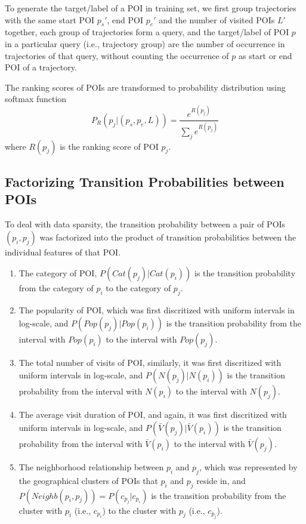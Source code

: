 To generate the target/label of a POI in training set,
we first group trajectories with the same start POI $p_s'$, end POI $p_e'$ and the number of visited POIs $L'$ together,
each group of trajectories form a query,
and the target/label of POI $p$ in a particular query (i.e., trajectory group) are the number of occurrence
in trajectories of that query, 
without counting the occurrence of $p$ as start or end POI of a trajectory.

The ranking scores of POIs are transformed to probability distribution using softmax function
\begin{displaymath}
    P_R(p_j |(p_s, p_e, L)) = \frac{e^{R(p_j)}}{\sum_j e^{R(p_j)}}
\end{displaymath}
where $R(p_j)$ is the ranking score of POI $p_j$.


\subsection{Factorizing Transition Probabilities between POIs}
\label{method:transition}
To deal with data sparsity,
the transition probability between a pair of POIs $(p_i, p_j)$ was factorized into the product of
transition probabilities between the individual features of that POI.
\begin{enumerate}
\item The category of POI, $P(Cat(p_j) | Cat(p_i))$
      is the transition probability from the category of $p_i$ to the category of $p_j$.
\item The popularity of POI, which was first discritized with uniform intervals in log-scale,
      and $P(Pop(p_j) | Pop(p_i))$ is the transition probability from the interval with $Pop(p_i)$ 
      to the interval with $Pop(p_j)$.
\item The total number of visits of POI, similarly, it was first discritized with uniform intervals in log-scale,
      and $P(N(p_j) | N(p_i))$ is the transition probability from the interval with $N(p_i)$ 
      to the interval with $N(p_j)$.
\item The average visit duration of POI, and again, it was first discritized with uniform intervals in log-scale,
      and $P(\bar{V}(p_j) | \bar{V}(p_i))$ is the transition probability from the interval with $\bar{V}(p_i)$ 
      to the interval with $\bar{V}(p_j)$.
\item The neighborhood relationship between $p_i$ and $p_j$,
      which was represented by the geographical clusters of POIs that $p_i$ and $p_j$ reside in,
      and $P(Neighb(p_i, p_j)) = P(c_{p_j} | c_{p_i})$ is the transition probability from the cluster with 
      $p_i$ (i.e., $c_{p_i}$) to the cluster with $p_j$ (i.e., $c_{p_j}$).
\end{enumerate}


